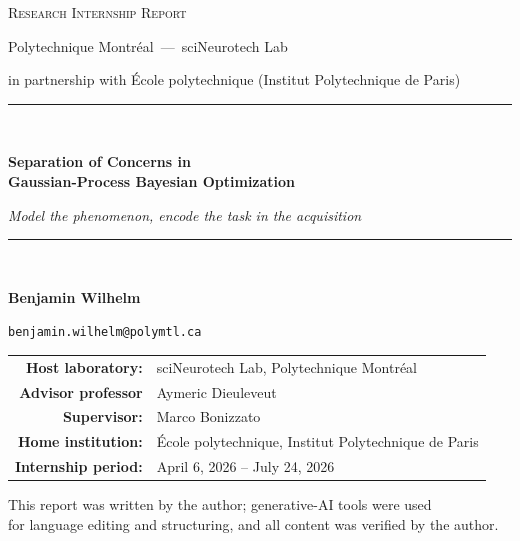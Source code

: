 \begin{titlepage}
\thispagestyle{empty}
\centering

\begin{minipage}{0.30\textwidth}
  \centering
\end{minipage}\hfill
\begin{minipage}{0.30\textwidth}
  \centering
\end{minipage}\hfill
\begin{minipage}{0.30\textwidth}
  \centering
\end{minipage}

\vfill

{\scshape\large Research Internship Report\par}
\vspace{0.4cm}
{\large Polytechnique Montr\'eal \,---\, sciNeurotech Lab\par}
{\normalsize in partnership with \'Ecole polytechnique (Institut Polytechnique de Paris)\par}

\vspace{1.6cm}
\rule{\linewidth}{0.5pt}\\[0.5cm]
{\huge\bfseries Separation of Concerns in\\[0.25cm] Gaussian-Process Bayesian Optimization\par}
\vspace{0.5cm}
{\Large\itshape Model the phenomenon, encode the task in the acquisition\par}
\rule{\linewidth}{0.5pt}\\[1.4cm]

{\Large\bfseries Benjamin Wilhelm\par}
\vspace{0.3cm}
{\normalsize \texttt{benjamin.wilhelm@polymtl.ca}\par}

\vspace{1.2cm}
\begin{tabular}{rl}
  \textbf{Host laboratory:} & sciNeurotech Lab, Polytechnique Montr\'eal \\[2pt]
  \textbf{Advisor professor}      & Aymeric Dieuleveut \\[2pt]
  \textbf{Supervisor:}      & Marco Bonizzato \\[2pt]
  \textbf{Home institution:} & \'Ecole polytechnique, Institut Polytechnique de Paris \\[2pt]
  \textbf{Internship period:} & April 6, 2026 -- July 24, 2026 \\[2pt]
\end{tabular}

\vfill
{\small This report was written by the author; generative-AI tools were used\\
for language editing and structuring, and all content was verified by the author.\par}

\end{titlepage}
